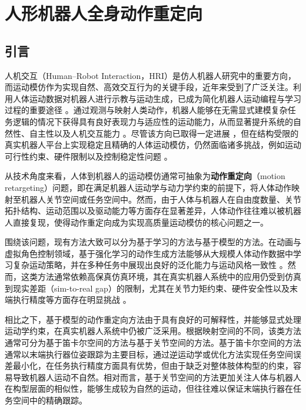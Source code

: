 \chapter{人形机器人全身动作重定向}%


\section{引言}
人机交互（Human–Robot Interaction，HRI）是仿人机器人研究中的重要方向，而运动模仿作为实现自然、高效交互行为的关键手段，近年来受到了广泛关注。利用人体运动数据对机器人进行示教与运动生成，已成为简化机器人运动编程与学习过程的重要途径 \cite{fu2024mobile, he2024learning, butepage2020imitating, kulic2016anthropomorphic}。通过观测与映射人类动作，机器人能够在无需显式建模复杂任务逻辑的情况下获得具有良好表现力与适应性的运动能力，从而显著提升系统的自然性、自主性以及人机交互能力 \cite{chi2024universal, bahl2022human}。尽管该方向已取得一定进展 \cite{ishiguro2020bilateral, ramos2018humanoid}，但在结构受限的真实机器人平台上实现稳定且精确的人体运动模仿，仍然面临诸多挑战，例如运动可行性约束、硬件限制以及控制稳定性问题 \cite{kim2009stable}。

从技术角度来看，人体到机器人的运动模仿通常可抽象为\textbf{动作重定向}（motion retargeting）问题，即在满足机器人运动学与动力学约束的前提下，将人体动作映射至机器人关节空间或任务空间中\cite{monzani2000using}。然而，由于人体与机器人在自由度数量、关节拓扑结构、运动范围以及驱动能力等方面存在显著差异，人体动作往往难以被机器人直接复现，使得动作重定向成为实现高质量运动模仿的核心问题之一\cite{kulic2016anthropomorphic,ayusawa2017motion,jiang2025multi}。

围绕该问题，现有方法大致可以分为基于学习的方法与基于模型的方法。在动画与虚拟角色控制领域，基于强化学习的动作生成方法能够从大规模人体动作数据中学习复杂运动策略，并在多种任务中展现出良好的泛化能力与运动风格一致性 \cite{peng2018deepmimic, peng2021amp, won2020scalable, luo2023perpetual}。然而，这类方法通常依赖高保真仿真环境，其在真实机器人系统中的应用仍受到仿真到现实差距（sim-to-real gap）的限制，尤其在关节力矩约束、硬件安全性以及末端执行精度等方面存在明显挑战 \cite{bohez2022imitate, tang2024humanmimic}。

相比之下，基于模型的动作重定向方法由于具有良好的可解释性，并能够显式处理运动学约束，在真实机器人系统中仍被广泛采用\cite{aristidou2018inverse,gleicher2001comparing}。根据映射空间的不同，该类方法通常可分为基于笛卡尔空间的方法与基于关节空间的方法。基于笛卡尔空间的方法通常以末端执行器位姿跟踪为主要目标，通过逆运动学或优化方法实现任务空间误差最小化，在任务执行精度方面具有优势\cite{siciliano1990kinematic,chiaverini1994review}，但由于缺乏对整体肢体构型的约束，容易导致机器人运动不自然。相对而言，基于关节空间的方法更加关注人体与机器人在构型层面的相似性，能够生成较为自然的运动\cite{xiang2010predictive,asfour2006armar}，但往往难以保证末端执行器在任务空间中的精确跟踪。

